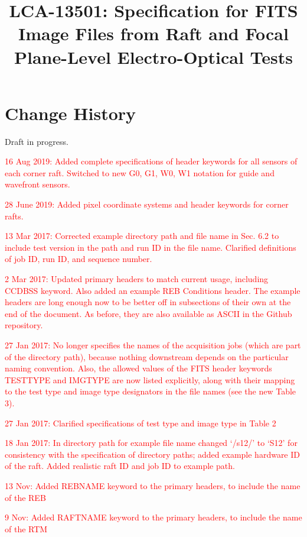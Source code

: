 \documentclass{article}[12pt]
\title{LCA-13501:  Specification for FITS Image Files from Raft and Focal Plane-Level Electro-Optical Tests}
\newcommand{\red}{\textcolor{red}}
\begin{document}
\maketitle
\tableofcontents
\newpage
\listoftables

\section{Change History}
Draft in progress. %

\red{16 Aug 2019:  Added complete specifications of header keywords for all sensors of each corner raft.  Switched to new G0, G1, W0, W1 notation for guide and wavefront sensors.}

\red{28 June 2019:  Added pixel coordinate systems and header keywords for corner rafts.}

\red{13 Mar 2017:  Corrected example directory path and file name in Sec. 6.2 to include test version in the path and run ID in the file name.  Clarified definitions of job ID, run ID, and sequence number.}

\red{2 Mar 2017:   Updated primary headers to match current usage, including CCDBSS keyword.  Also added an example REB Conditions header.  The example headers are long enough now to be better off in subsections of their own at the end of the document.  As before, they are also available as ASCII in the Github repository.}

\red{27 Jan 2017:  No longer specifies the names of the acquisition jobs (which are part of the directory path), because nothing downstream depends on the particular naming convention.  Also, the allowed values of the FITS header keywords TESTTYPE and IMGTYPE are now listed explicitly, along with their mapping to the test type and image type designators in the file names (see the new Table 3).}

\red{27 Jan 2017:  Clarified specifications of test type and image type in Table 2}

\red{18 Jan 2017:  In directory path for example file name changed `/s12/' to `S12' for consistency with the specification of directory paths; added example hardware ID of the raft.  Added realistic raft ID and job ID to example path.}

\red{13 Nov: Added REBNAME keyword to the primary headers, to include the name of the REB}

\red{9 Nov: Added RAFTNAME keyword to the primary headers, to include the name of the RTM}
\end{document}

